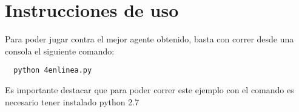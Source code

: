 \section{Instrucciones de uso}
Para poder jugar contra el mejor agente obtenido, basta con correr desde una consola el siguiente comando:
\begin{verbatim}
  python 4enlinea.py
\end{verbatim}
Es importante destacar que para poder correr este ejemplo con el comando es necesario tener instalado python 2.7
%
%
%
%
%
%
%
%
%
%
